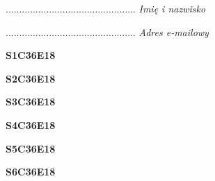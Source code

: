 \begin{turn}{90}\begin{minipage}{\linewidth} \vspace{20mm} ................................................  \textit{Imię i nazwisko}\end{minipage}\end{turn}

\begin{turn}{90}\begin{minipage}{\linewidth} \vspace{20mm} ................................................  \textit{Adres e-mailowy}\end{minipage}\end{turn}

\begin{turn}{90}\huge \begin{minipage}{\linewidth} \vspace{10mm}\textbf{S1C36E18}\end{minipage}\end{turn}

\begin{turn}{90}\huge \begin{minipage}{\linewidth} \vspace{10mm}\textbf{S2C36E18}\end{minipage}\end{turn}

\begin{turn}{90}\huge \begin{minipage}{\linewidth} \vspace{10mm}\textbf{S3C36E18}\end{minipage}\end{turn}

\begin{turn}{90}\huge \begin{minipage}{\linewidth} \vspace{10mm}\textbf{S4C36E18}\end{minipage}\end{turn}

\begin{turn}{90}\huge \begin{minipage}{\linewidth} \vspace{10mm}\textbf{S5C36E18}\end{minipage}\end{turn}

\begin{turn}{90}\huge \begin{minipage}{\linewidth} \vspace{10mm}\textbf{S6C36E18}\end{minipage}\end{turn}

